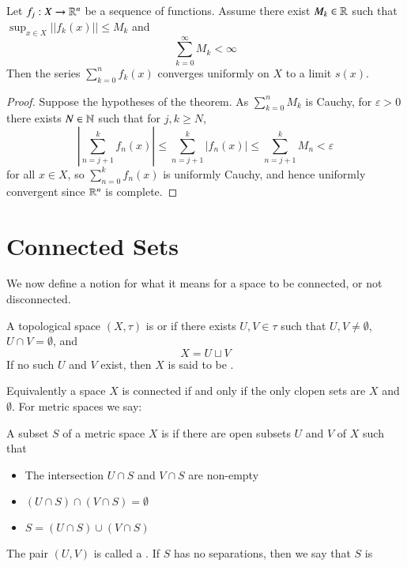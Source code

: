 \begin{theorem}
    Let $f_j:X\rightarrow \mathbb R^n$ be a sequence of functions. Assume there exist $M_k \in \mathbb R$ such that $\sup_{x\in X}||f_k(x)|| \leq M_k$ and $$\sum_{k=0}^{\infty}M_k < \infty$$ Then the series $\sum_{k=0}^nf_k(x)$ converges uniformly on $X$ to a limit $s(x)$.
\end{theorem}
\begin{proof}
    Suppose the hypotheses of the theorem. As $\sum_{k=0}^nM_k$ is Cauchy, for $\varepsilon >0$ there exists $N \in \mathbb N$ such that for $j,k \geq N$, $$\left|\sum_{n=j+1}^kf_n(x)\right|\leq \sum_{n=j+1}^k|f_n(x)| \leq \sum_{n=j+1}^kM_n < \varepsilon$$ for all $x \in X$, so $\sum_{n=0}^kf_n(x)$ is uniformly Cauchy, and hence uniformly convergent since $\mathbb R^n$ is complete.
\end{proof}


\section{Connected Sets}


We now define a notion for what it means for a space to be connected, or not disconnected.

\begin{definition}
    A topological space $(X,\tau)$ is  or  if there exists $U,V \in \tau$ such that $U,V\neq \emptyset$, $U\cap V = \emptyset$, and $$X = U\sqcup V$$
    If no such $U$ and $V$ exist, then $X$ is said to be .
\end{definition}

Equivalently a space $X$ is connected if and only if the only clopen sets are $X$ and $\emptyset$. For metric spaces we say:

\begin{definition}
    A subset $S$ of a metric space $X$ is  if there are open subsets $U$ and $V$ of $X$ such that \begin{itemize}
        \item The intersection $U\cap S$ and $V\cap S$ are non-empty
        \item $(U\cap S) \cap (V\cap S) = \emptyset$
        \item $S = (U\cap S)\cup(V\cap S)$
    \end{itemize}
    The pair $(U,V)$ is called a . If $S$ has no separations, then we say that $S$ is 
\end{definition}

